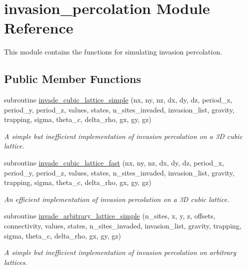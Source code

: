 \hypertarget{classinvasion__percolation}{
\section{invasion\-\_\-percolation \-Module \-Reference}
\label{classinvasion__percolation}
}


\-This module contains the functions for simulating invasion percolation.  


\subsection*{\-Public \-Member \-Functions}
\begin{DoxyCompactItemize}
\item 
subroutine \hyperlink{classinvasion__percolation_a4424ce72dbef1b3465996d08ca3b3e6e}{invade\-\_\-cubic\-\_\-lattice\-\_\-simple} (nx, ny, nz, dx, dy, dz, period\-\_\-x, period\-\_\-y, period\-\_\-z, values, states, n\-\_\-sites\-\_\-invaded, invasion\-\_\-list, gravity, trapping, sigma, theta\-\_\-c, delta\-\_\-rho, gx, gy, gz)
\begin{DoxyCompactList}\small\item\em \-A simple but inefficient implementation of invasion percolation on a 3\-D cubic lattice. \end{DoxyCompactList}\item 
subroutine \hyperlink{classinvasion__percolation_a1c8680d7b1d4bcb917c381eb2ea65428}{invade\-\_\-cubic\-\_\-lattice\-\_\-fast} (nx, ny, nz, dx, dy, dz, period\-\_\-x, period\-\_\-y, period\-\_\-z, values, states, n\-\_\-sites\-\_\-invaded, invasion\-\_\-list, gravity, trapping, sigma, theta\-\_\-c, delta\-\_\-rho, gx, gy, gz)
\begin{DoxyCompactList}\small\item\em \-An efficient implementation of invasion percolation on a 3\-D cubic lattice. \end{DoxyCompactList}\item 
subroutine \hyperlink{classinvasion__percolation_ad749a176ab9a880b71ce83034d6f849d}{invade\-\_\-arbitrary\-\_\-lattice\-\_\-simple} (n\-\_\-sites, x, y, z, offsets, connectivity, values, states, n\-\_\-sites\-\_\-invaded, invasion\-\_\-list, gravity, trapping, sigma, theta\-\_\-c, delta\-\_\-rho, gx, gy, gz)
\begin{DoxyCompactList}\small\item\em \-A simple but inefficient implementation of invasion percolation on arbitrary lattices. \end{DoxyCompactList}\item 

\end{DoxyCompactItemize}
